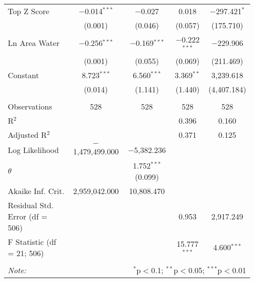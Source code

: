\begin{table}[!htbp]
\begin{tabular}{@{\extracolsep{5pt}}lcccc}
  Top Z Score & $-$0.014$^{***}$ & $-$0.027 & 0.018 & $-$297.421$^{*}$ \\ 
  & (0.001) & (0.046) & (0.057) & (175.710) \\ 
  Ln Area Water & $-$0.256$^{***}$ & $-$0.169$^{***}$ & $-$0.222$^{***}$ & $-$229.906 \\ 
  & (0.001) & (0.055) & (0.069) & (211.469) \\ 
  Constant & 8.723$^{***}$ & 6.560$^{***}$ & 3.369$^{**}$ & 3,239.618 \\ 
  & (0.014) & (1.141) & (1.440) & (4,407.184) \\ 
 \hline \\[-1.8ex] 
Observations & 528 & 528 & 528 & 528 \\ 
R$^{2}$ &  &  & 0.396 & 0.160 \\ 
Adjusted R$^{2}$ &  &  & 0.371 & 0.125 \\ 
Log Likelihood & $-$1,479,499.000 & $-$5,382.236 &  &  \\ 
$\theta$ &  & 1.752$^{***}$  (0.099) &  &  \\ 
Akaike Inf. Crit. & 2,959,042.000 & 10,808.470 &  &  \\ 
Residual Std. Error (df = 506) &  &  & 0.953 & 2,917.249 \\ 
F Statistic (df = 21; 506) &  &  & 15.777$^{***}$ & 4.600$^{***}$ \\ 
\hline 
\hline \\[-1.8ex] 
\textit{Note:}  & \multicolumn{4}{r}{$^{*}$p$<$0.1; $^{**}$p$<$0.05; $^{***}$p$<$0.01} \\ 
\end{tabular} 
\end{table} 
